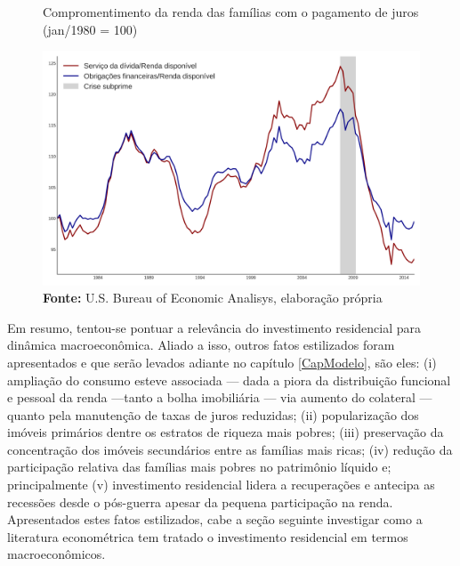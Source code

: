 \begin{figure}[H]
	\centering
	\caption{Compromentimento da renda das famílias com o pagamento de juros (jan/1980 = 100)}
	\label{FigServDiv}
	\includegraphics[width=\textwidth]{../../Dados/Fatos_Estilizados/figs/Serv_Divida.png}
	\caption*{\textbf{Fonte:} U.S. Bureau of Economic Analisys, elaboração própria}
\end{figure}


Em resumo, tentou-se pontuar a relevância do investimento residencial para dinâmica macroeconômica.
Aliado a isso, outros fatos estilizados foram apresentados e que serão levados adiante no capítulo \ref{CapModelo}, são eles:
	(i) ampliação do consumo esteve associada --- dada a piora da distribuição funcional e pessoal da renda ---tanto a bolha imobiliária --- via aumento do colateral --- quanto pela manutenção de taxas de juros reduzidas;
	(ii) popularização dos imóveis primários dentre os estratos de riqueza mais pobres;
	(iii) preservação da concentração dos imóveis secundários entre as famílias mais ricas;
	(iv) redução da participação relativa das famílias mais pobres no patrimônio líquido e; principalmente 
	(v) investimento residencial lidera a recuperações e antecipa as recessões desde o pós-guerra apesar da pequena participação na renda.
Apresentados estes fatos estilizados, cabe a seção seguinte investigar como a literatura econométrica tem tratado o investimento residencial em termos macroeconômicos.

